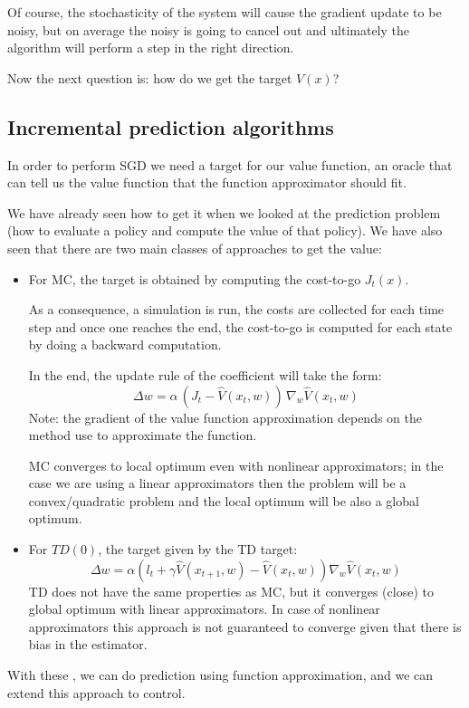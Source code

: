 Of course, the stochasticity of the system will cause the gradient update to be noisy, but on average the noisy is going to cancel out and ultimately the algorithm will perform a step in the right direction.

Now the next question is: how do we get the target $V(x)$?
\subsection{Incremental prediction algorithms}
In order to perform SGD we need a target for our value function, an oracle that can tell us the value function that the function approximator should fit.

We have already seen how to get it when we looked at the prediction problem (how to evaluate a policy and compute the value of that policy).
We have also seen that there are two main classes of approaches to get the value:
\begin{itemize}
\item For MC, the target is obtained by computing the cost-to-go $J_t(x)$.

As a consequence, a simulation is run, the costs are collected for each time step and once one reaches the end, the cost-to-go is computed for each state by doing a backward computation.

In the end, the update rule of the coefficient will take the form:
\[\Delta w = \alpha\,(J_t - \hat{V}(x_t, w))\,\nabla_w \hat{V}(x_t, w)\]
Note: the gradient of the value function approximation depends on the method use to approximate the function.

MC converges to local optimum even with nonlinear approximators; in the case we are using a linear approximators then the problem will be a convex/quadratic problem and the local optimum will be also a global optimum.

\item For $TD(0)$, the target given by the TD target:
\[\Delta w  = \alpha (l_t + \gamma \hat{V}(x_{t+1}, w) - \hat{V}(x_t, w)) \nabla_w \hat{V}(x_t,w)\]
TD does not have the same properties as MC, but it converges (close) to global optimum with linear approximators. In case of nonlinear approximators this approach is not guaranteed to converge given that there is bias in the estimator.
\end{itemize}

With these , we can do prediction using function approximation, and we can extend this approach to control.

